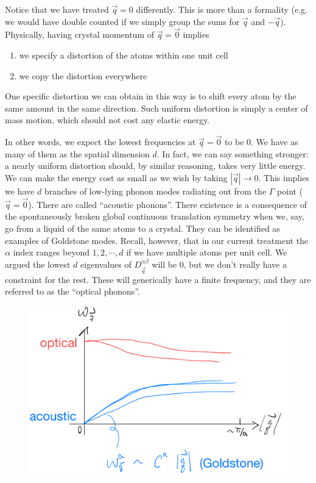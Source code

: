 Notice that we have treated $\vec{q}=0$ differently. This is more than a formality (e.g. we would have double counted if we simply group the sums for $\vec{q}$ and $-\vec{q}$). Physically, having crystal momentum of $\vec{q}=\vec{0}$ implies
\begin{enumerate}
    \item we specify a distortion of the atoms within one unit cell
    \item we copy the distortion everywhere
\end{enumerate}

One specific distortion we can obtain in this way is to shift every atom by the same amount in the same direction. Such uniform distortion is simply a center of mass motion, which should not cost any elastic energy.

In other words, we expect the lowest frequencies at $\vec{q}=\vec{0}$ to be $0$. We have as many of them as the spatial dimension $d$. In fact, we can say something stronger: a nearly uniform distortion should, by similar reasoning, takes very little energy. We can make the energy cost as small as we wish by taking $|\vec{q}|\to 0$. This implies we have $d$ branches of low-lying phonon modes radiating out from the $\Gamma$ point ($\vec{q}=\vec{0}$). There are called ``acoustic phonons''. There existence is a consequence of the spontaneously broken global continuous translation symmetry when we, say, go from a liquid of the same atoms to a crystal. They can be identified as examples of Goldstone modes. Recall, however, that in our current treatment the $\alpha$ index ranges beyond $1,2,\cdots,d$ if we have multiple atoms per unit cell. We argued the lowest $d$ eigenvalues of $D_{\vec{q}}^{\alpha\beta}$ will be $0$, but we don't really have a constraint for the rest. These will generically have a finite frequency, and they are referred to as the ``optical phonons''.

\begin{figure}[ht]
    \centering
    \includegraphics[width=\textwidth]{jupyterbook/data/fig/lec03-fig00.png}
\end{figure}

